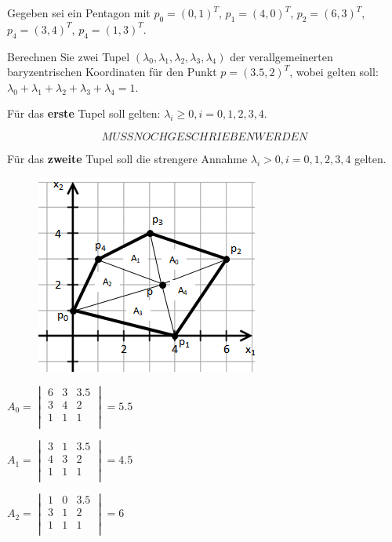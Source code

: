 \documentclass[a4paper,10pt,DIV=14]{scrartcl}
\begin{document}
Gegeben sei ein Pentagon mit $p_0 = (0, 1)^T$, $p_1 = (4, 0)^T$, $p_2 = (6, 3)^T$, $p_4 = (3, 4)^T$, $p_4 = (1, 3)^T$.

Berechnen Sie zwei Tupel $(\lambda_0, \lambda_1, \lambda_2, \lambda_3, \lambda_4)$ der verallgemeinerten baryzentrischen Koordinaten für den Punkt $p = (3.5, 2)^T$, wobei gelten soll: $\lambda_0 + \lambda_1 + \lambda_2 + \lambda_3 + \lambda_4 = 1$.

Für das \textbf{erste} Tupel soll gelten: $\lambda_i \geq 0, i = 0,1,2,3,4$.


$$ MUSS NOCH GESCHRIEBEN WERDEN $$


Für das \textbf{zweite} Tupel soll die strengere Annahme $\lambda_i > 0, i = 0,1,2,3,4$ gelten.

\begin{figure}[!htbp]
	\centering
	\includegraphics[]{simplex}
\end{figure}

$A_0 = \begin{vmatrix}
			6 & 3 &  3.5 \\
			3 & 4 &  2   \\
			1 & 1 &  1   \\
		\end{vmatrix} = 5.5 $
	
$A_1 = \begin{vmatrix}
			3 & 1 &  3.5 \\
			4 & 3 &  2   \\
			1 & 1 &  1   \\
		\end{vmatrix} = 4.5 $

$A_2 = \begin{vmatrix}
			1 & 0 &  3.5 \\
			3 & 1 &  2   \\
			1 & 1 &  1   \\
		\end{vmatrix} = 6 $
\end{document}
